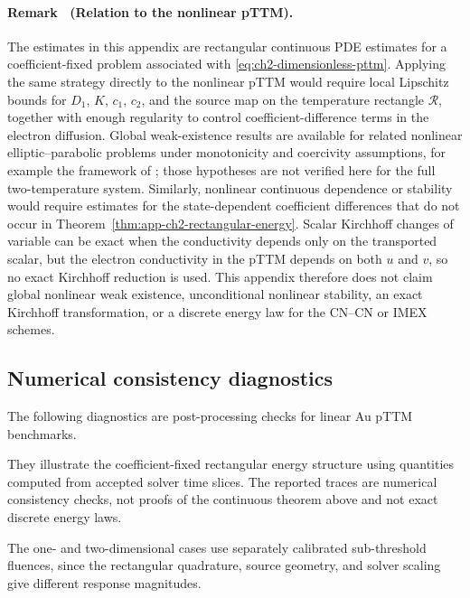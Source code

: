 \paragraph{Remark \thetheorem\ (Relation to the nonlinear pTTM).}\label{rem:app-ch2-rectangular-nonlinear-limits}
The estimates in this appendix are rectangular continuous PDE estimates for a coefficient-fixed problem associated with \eqref{eq:ch2-dimensionless-pttm}. Applying the same strategy directly to the nonlinear pTTM would require local Lipschitz bounds for \(D_1\), \(K\), \(c_1\), \(c_2\), and the source map on the temperature rectangle \(\mathcal{R}\), together with enough regularity to control coefficient-difference terms in the electron diffusion. Global weak-existence results are available for related nonlinear elliptic--parabolic problems under monotonicity and coercivity assumptions, for example the framework of \cite[pp.~311--341]{Alt_Luckhaus_1983}; those hypotheses are not verified here for the full two-temperature system. Similarly, nonlinear continuous dependence or stability would require estimates for the state-dependent coefficient differences that do not occur in Theorem~\ref{thm:app-ch2-rectangular-energy}. Scalar Kirchhoff changes of variable can be exact when the conductivity depends only on the transported scalar, but the electron conductivity in the pTTM depends on both \(u\) and \(v\), so no exact Kirchhoff reduction is used. This appendix therefore does not claim global nonlinear weak existence, unconditional nonlinear stability, an exact Kirchhoff transformation, or a discrete energy law for the CN--CN or IMEX schemes.

\subsection{Numerical consistency diagnostics}
\label{sec:app-ch2-energy-diagnostics}

The following diagnostics are post-processing checks for linear Au pTTM benchmarks.

They illustrate the coefficient-fixed rectangular energy structure using quantities computed from accepted solver time slices. The reported traces are numerical consistency checks, not proofs of the continuous theorem above and not exact discrete energy laws.

The one- and two-dimensional cases use separately calibrated sub-threshold fluences, since the rectangular quadrature, source geometry, and solver scaling give different response magnitudes.

